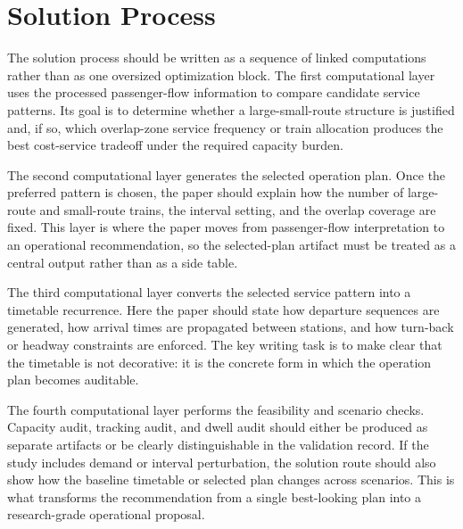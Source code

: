 \section{Solution Process}

The solution process should be written as a sequence of linked computations rather than as one oversized optimization block. The first computational layer uses the processed passenger-flow information to compare candidate service patterns. Its goal is to determine whether a large-small-route structure is justified and, if so, which overlap-zone service frequency or train allocation produces the best cost-service tradeoff under the required capacity burden.

The second computational layer generates the selected operation plan. Once the preferred pattern is chosen, the paper should explain how the number of large-route and small-route trains, the interval setting, and the overlap coverage are fixed. This layer is where the paper moves from passenger-flow interpretation to an operational recommendation, so the selected-plan artifact must be treated as a central output rather than as a side table.

The third computational layer converts the selected service pattern into a timetable recurrence. Here the paper should state how departure sequences are generated, how arrival times are propagated between stations, and how turn-back or headway constraints are enforced. The key writing task is to make clear that the timetable is not decorative: it is the concrete form in which the operation plan becomes auditable.

The fourth computational layer performs the feasibility and scenario checks. Capacity audit, tracking audit, and dwell audit should either be produced as separate artifacts or be clearly distinguishable in the validation record. If the study includes demand or interval perturbation, the solution route should also show how the baseline timetable or selected plan changes across scenarios. This is what transforms the recommendation from a single best-looking plan into a research-grade operational proposal.
